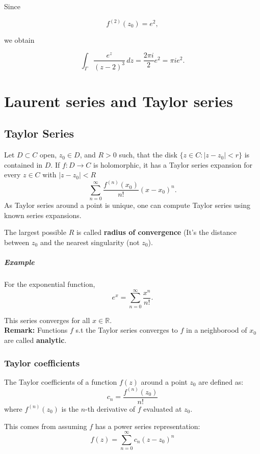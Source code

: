 Since

\[
f^{(2)}(z_0)=e^2,
\]

we obtain

\[
\int_\Gamma \frac{e^z}{(z-2)^3}\,dz
=
\frac{2\pi i}{2}e^2
=
\pi i e^2.
\]

\chapter{Laurent series and Taylor series}\label{chap:laurent_series_and_taylor_series} %

\section{Taylor Series}

Let $D \subset C$ open, $z_0 \in D$, and $R > 0$ such, that the disk $\{z \in C : |z - z_0| < r \}$ is contained in $D$. If $f: D \to C$ is holomorphic, it has a Taylor series expansion for every $z \in C$ with $|z - z_0| < R$
\[
\sum_{n=0}^{\infty}
\frac{f^{(n)}(x_0)}{n!}(x-x_0)^n.
\]
As Taylor series around a point is unique, one can compute Taylor series using known series expansions.

The largest possible $R$ is called \textbf{radius of convergence} (It's the distance between $z_0$ and the nearest singularity (not $z_0$).

\paragraph{Example}
For the exponential function,
\[
e^x
=
\sum_{n=0}^{\infty}
\frac{x^n}{n!}.
\]

This series converges for all $x \in \mathbb{R}$. \\
\textbf{Remark:} Functions $f$ s.t the Taylor series converges to $f$ in a neighborood of $x_0$ are called \textbf{analytic}.

\subsection{Taylor coefficients}
\begin{definition}
  The Taylor coefficients of a function $f(z)$ around a point $z_0$ are defined as: \[
    c_n = \frac{f^{(n)}(z_0)}{n!}
  \]
  where $f^{(n)}(z_0)$ is the $n$-th derivative of $f$ evaluated at $z_0$.

  This comes from assuming $f$ has a power series representation: \[
    f(z) = \sum_{n=0}^{\infty}c_n(z-z_0)^n  
  \]
\end{definition}


